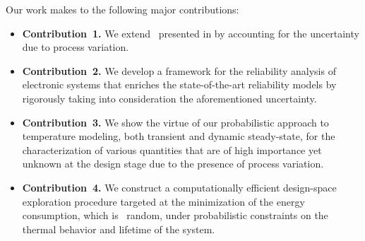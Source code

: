 Our work makes to the following major contributions:
\begin{itemize}
  \item {\bfseries Contribution~1.} We extend \dssta\ presented in \cite{ukhov2012} by accounting for the uncertainty due to process variation.
  \item {\bfseries Contribution~2.} We develop a framework for the reliability analysis of electronic systems that enriches the state-of-the-art reliability models by rigorously taking into consideration the aforementioned uncertainty.
  \item {\bfseries Contribution~3.} We show the virtue of our probabilistic approach to temperature modeling, both transient and dynamic steady-state, for the characterization of various quantities that are of high importance yet unknown at the design stage due to the presence of process variation.
  \item {\bfseries Contribution~4.} We construct a computationally efficient design-space exploration procedure targeted at the minimization of the energy consumption, which is \apriori\ random, under probabilistic constraints on the thermal behavior and lifetime of the system.
\end{itemize}
